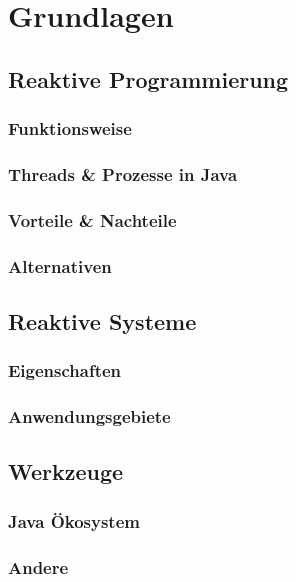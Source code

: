 
\section{Grundlagen}
\label{section:grundlagen}

\subsection{Reaktive Programmierung}
\label{section:reaktive_programmierung}
\subsubsection{Funktionsweise}

\subsubsection{Threads \& Prozesse in Java}

\subsubsection{Vorteile \& Nachteile}

\subsubsection{Alternativen}

\subsection{Reaktive Systeme}
\label{section:reaktive_systeme}

\subsubsection{Eigenschaften}

\subsubsection{Anwendungsgebiete}

\subsection{Werkzeuge}
\label{section:werkzeuge}
\subsubsection{Java Ökosystem}

\subsubsection{Andere}